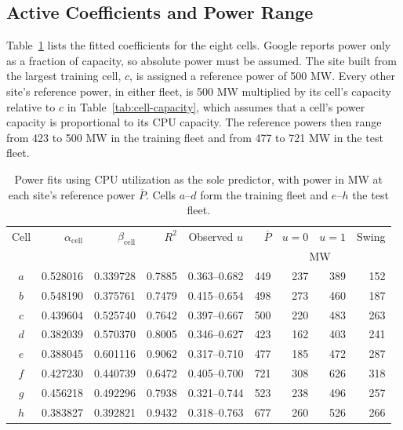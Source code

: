 \documentclass{UNCC-thesis}
\begin{document}
\subsection{Active Coefficients and Power Range}
\label{subsec:powerdata-coefficients}

Table~\ref{tab:powerdata-coefficients} lists the fitted coefficients for the
eight cells. Google reports power only as a fraction of capacity, so absolute
power must be assumed. The site built from the largest training cell, \(c\),
is assigned a reference power of 500 MW. Every other site's reference power,
in either fleet, is 500 MW multiplied by its cell's capacity relative to
\(c\) in Table~\ref{tab:cell-capacity}, which assumes that a cell's power
capacity is proportional to its CPU capacity. The reference powers then range
from 423 to 500 MW in the training fleet and from 477 to 721 MW in the test
fleet. 

\begin{table}[htbp]
  \centering
  \footnotesize
  \caption{Power fits using CPU utilization as the sole predictor, with
  power in MW at each site's reference power \(\overline P\). Cells
  \(a\)--\(d\) form the training fleet and \(e\)--\(h\) the test fleet.}
  \label{tab:powerdata-coefficients}
  \begin{tabular}{@{}crrrcrrrr@{}}
    \toprule
    Cell & \(\alpha_{\mathrm{cell}}\) & \(\beta_{\mathrm{cell}}\) & \(R^2\) & Observed \(u\)
         & \(\overline P\) & \(u=0\) & \(u=1\) & Swing \\
         & & & & & \multicolumn{4}{c}{MW} \\
    \midrule
    \(a\) & 0.528016 & 0.339728 & 0.7885 & 0.363--0.682
          & 449 & 237 & 389 & 152 \\
    \(b\) & 0.548190 & 0.375761 & 0.7479 & 0.415--0.654
          & 498 & 273 & 460 & 187 \\
    \(c\) & 0.439604 & 0.525740 & 0.7642 & 0.397--0.667
          & 500 & 220 & 483 & 263 \\
    \(d\) & 0.382039 & 0.570370 & 0.8005 & 0.346--0.627
          & 423 & 162 & 403 & 241 \\
    \addlinespace
    \(e\) & 0.388045 & 0.601116 & 0.9062 & 0.317--0.710
          & 477 & 185 & 472 & 287 \\
    \(f\) & 0.427230 & 0.440739 & 0.6472 & 0.405--0.700
          & 721 & 308 & 626 & 318 \\
    \(g\) & 0.456218 & 0.492296 & 0.7938 & 0.321--0.744
          & 523 & 238 & 496 & 257 \\
    \(h\) & 0.383827 & 0.392821 & 0.9432 & 0.318--0.763
          & 677 & 260 & 526 & 266 \\
    \bottomrule
  \end{tabular}
\end{table}
\end{document}
